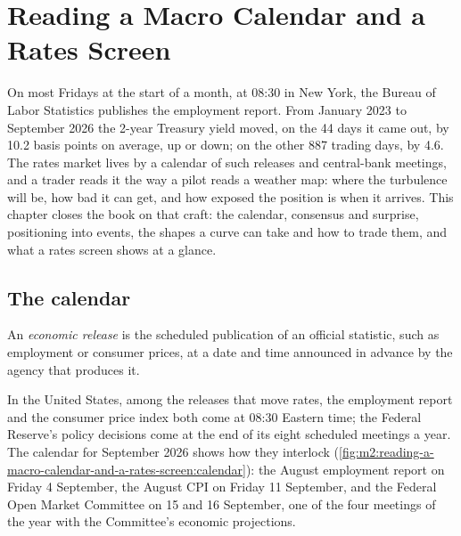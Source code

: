 \chapter{Reading a Macro Calendar and a Rates Screen}\label{ch:m2:reading-a-macro-calendar-and-a-rates-screen}

On most Fridays at the start of a month, at 08:30 in New York, the Bureau of Labor
Statistics publishes the employment report. From January 2023 to September 2026 the
2-year Treasury yield moved, on the 44 days it came out, by 10.2 basis points on average,
up or down; on the other 887 trading days, by 4.6. The rates market lives by a calendar of
such releases and central-bank meetings, and a trader reads it the way a pilot reads a
weather map: where the turbulence will be, how bad it can get, and how exposed the
position is when it arrives. This chapter closes the book on that craft: the calendar,
consensus and surprise, positioning into events, the shapes a curve can take and how to
trade them, and what a rates screen shows at a glance.

\section{The calendar}

\begin{definition}\label{def:m2:reading-a-macro-calendar-and-a-rates-screen:release}
An \emph{economic release} is the scheduled publication of an
official statistic, such as employment or consumer prices, at a date and time announced in
advance by the agency that produces it.
\end{definition}

In the United States, among the releases that move rates, the employment report and the
consumer price index both come at 08:30 Eastern time; the Federal Reserve's policy
decisions come at the end of its eight scheduled meetings a year. The calendar for
September 2026 shows how they interlock
(\cref{fig:m2:reading-a-macro-calendar-and-a-rates-screen:calendar}): the August
employment report on Friday 4 September, the August CPI on Friday 11 September, and the
Federal Open Market Committee on 15 and 16 September, one of the four meetings of the year
with the Committee's economic projections.

